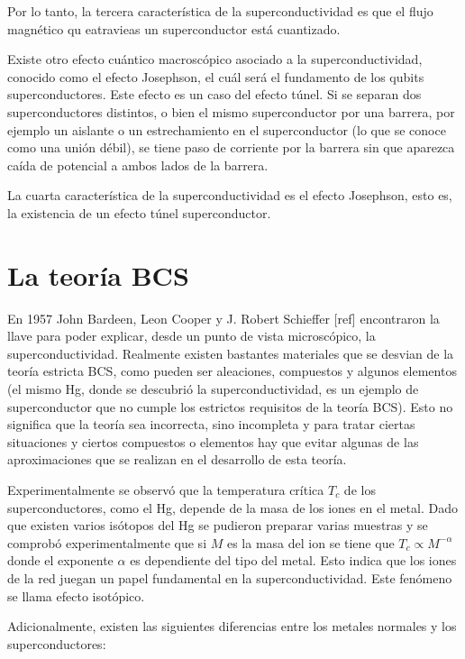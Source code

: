 Por lo tanto, la tercera característica de la superconductividad es que el flujo magnético qu eatravieas un superconductor está cuantizado.

Existe otro efecto cuántico macroscópico asociado a la superconductividad, conocido como el efecto Josephson, el cuál será el fundamento de los qubits superconductores. Este efecto es un caso del efecto túnel. Si se separan dos superconductores distintos, o bien el mismo superconductor por una barrera, por ejemplo un aislante o un estrechamiento en el superconductor (lo que se conoce como una unión débil), se tiene paso de corriente por la barrera sin que aparezca caída de potencial a ambos lados de la barrera.

La cuarta característica de la superconductividad es el efecto Josephson, esto es, la existencia de un efecto túnel superconductor.


\section{La teoría BCS}

En 1957 John Bardeen, Leon Cooper y J. Robert Schieffer [ref] encontraron la llave para poder explicar, desde un punto de vista microscópico, la superconductividad. Realmente existen bastantes materiales que se desvian de la teoría estricta BCS, como pueden ser aleaciones, compuestos y algunos elementos (el mismo Hg, donde se descubrió la superconductividad, es un ejemplo de superconductor que no cumple los estrictos requisitos de la teoría BCS). Esto no significa que la teoría sea incorrecta, sino incompleta y para tratar ciertas situaciones y ciertos compuestos o elementos hay que evitar algunas de las aproximaciones que se realizan en el desarrollo de esta teoría.

Experimentalmente se observó que la temperatura crítica $T_c$ de los superconductores, como el Hg, depende de la masa de los iones en el metal. Dado que existen varios isótopos del Hg se pudieron preparar varias muestras y se comprobó experimentalmente que si $M$ es la masa del ion se tiene que $T_c \propto M^{-\alpha}$ donde el exponente $\alpha$ es dependiente del tipo del metal. Esto indica que los iones de la red juegan un papel fundamental en la superconductividad. Este fenómeno se llama efecto isotópico.

Adicionalmente, existen las siguientes diferencias entre los metales normales y los superconductores:


